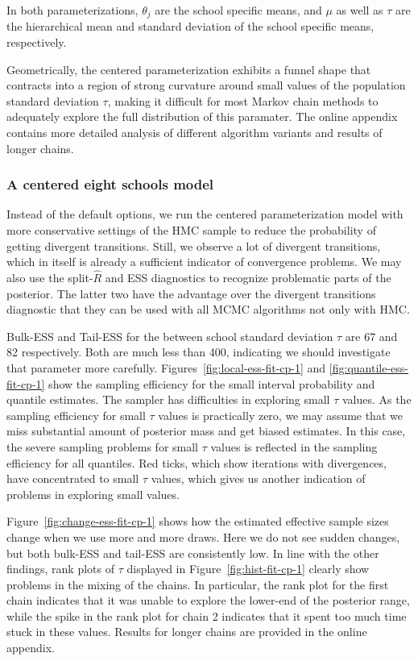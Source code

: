 \documentclass[american,]{article}
\begin{document}
In both parameterizations, $\theta_j$ are the school specific means,
and $\mu$ as well as $\tau$ are the hierarchical mean and standard deviation 
of the school specific means, respectively.

Geometrically, the centered parameterization exhibits a funnel shape
that contracts into a region of strong curvature around small
values of the population standard deviation $\tau$, making it difficult for most
Markov chain methods to adequately explore the full distribution of this
paramater. The online appendix contains more detailed analysis of different 
algorithm variants and results of longer chains.

\hypertarget{a-centered-eight-schools-model}{%
\subsubsection*{A centered eight schools
model}\label{a-centered-eight-schools-model}}

Instead of the default options, we run the centered parameterization
model with more conservative settings of the HMC sample to reduce the
probability of getting divergent transitions. Still, we observe a lot of divergent
transitions, which in itself is already a sufficient indicator of
convergence problems. We may also use the split-\(\widehat{R}\) and ESS
diagnostics to recognize problematic parts of the posterior. The latter
two have the advantage over the divergent transitions diagnostic that they
can be used with all MCMC algorithms not only with HMC.

Bulk-ESS and Tail-ESS for the between school standard deviation $\tau$
are 67 and 82 respectively. Both are much less than 400, indicating we
should investigate that parameter more carefully.
Figures~\ref{fig:local-ess-fit-cp-1} and
\ref{fig:quantile-ess-fit-cp-1} show the sampling efficiency for the
small interval probability and quantile estimates.
The sampler has difficulties in exploring small $\tau$ values. As the
sampling efficiency for small $\tau$ values is practically zero, we
may assume that we miss substantial amount of posterior mass and
get biased estimates. In this case, the severe sampling problems for
small $\tau$ values is reflected in the sampling efficiency for all
quantiles. Red ticks, which show iterations with divergences, have
concentrated to small $\tau$ values, which gives us another indication
of problems in exploring small values.

Figure~\ref{fig:change-ess-fit-cp-1} shows how the estimated effective
sample sizes change when we use more and more draws. Here we do not
see sudden changes, but both bulk-ESS and tail-ESS are consistently low. 
In line with the other findings, rank plots of $\tau$ displayed in
Figure~\ref{fig:hist-fit-cp-1} clearly show problems in the mixing of
the chains.  In particular, the rank plot for the first chain indicates that it was unable to 
explore the lower-end of the posterior range, while the spike in the rank plot 
for chain 2 indicates that it spent too much time stuck in these values.
  Results for longer chains are provided in the online appendix.
\end{document}
